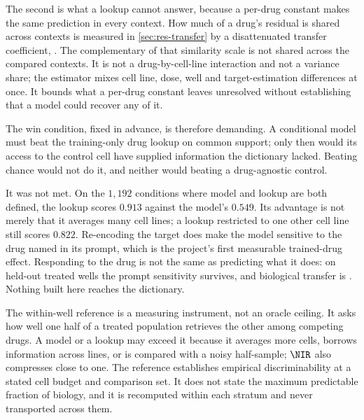 The second is what a lookup cannot answer, because a per-drug constant makes the
same prediction in every context. How much of a drug's residual is shared across
contexts is measured in \cref{sec:res-transfer} by a disattenuated transfer
coefficient, . The complementary
 of that similarity scale is not shared across the
compared contexts. It is not a drug-by-cell-line interaction and not a variance
share; the estimator mixes cell line, dose, well and target-estimation
differences at once. It bounds what a per-drug constant leaves unresolved
without establishing that a model could recover any of it.

The win condition, fixed in advance, is therefore demanding. A
conditional model must beat the training-only drug lookup on common support;
only then would its access to the control cell have supplied information the
dictionary lacked. Beating chance would not do it, and neither would beating a
drug-agnostic control.

It was not met. On the $1{,}192$ conditions where model and lookup
are both defined, the lookup scores $0.913$ against the model's $0.549$. Its
advantage is not merely that it averages many cell lines; a lookup restricted to
one other cell line still scores $0.822$. Re-encoding the
target does make the model sensitive to the drug named in its prompt, which is
the project's first measurable trained-drug effect. Responding to the drug is
not the same as predicting what it does: on held-out treated wells the prompt
sensitivity survives, and biological transfer is \notestablished. Nothing built
here reaches the dictionary.

\begin{scopelimit}
The within-well reference is a measuring instrument, not an oracle ceiling. It
asks how well one half of a treated population retrieves the other among
competing drugs. A model or a lookup may exceed it because it averages more
cells, borrows information across lines, or is compared with a noisy half-sample;
$\NIR$ also compresses close to one. The reference establishes empirical
discriminability at a stated cell budget and comparison set. It does not state
the maximum predictable fraction of biology, and it is recomputed within each
stratum and never transported across them.
\end{scopelimit}

